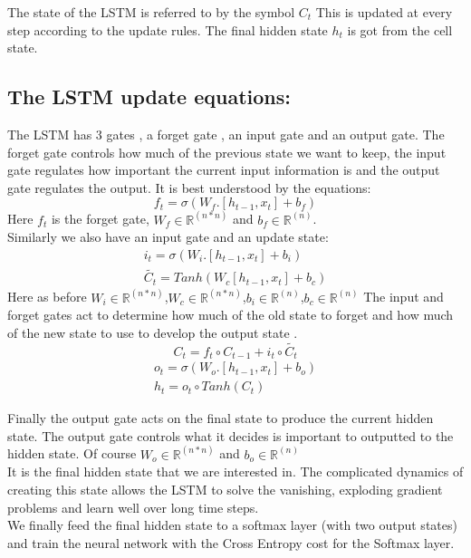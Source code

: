 \documentclass{article} %
\begin{document}
The state of the LSTM is referred to by the symbol $C_t$ This is updated at every step according to the update rules. The final hidden state
$h_t$ is got from the cell state.

\subsection{The LSTM update equations:}
The LSTM has 3 gates , a forget gate , an input gate and an output gate. The forget gate controls how much of the previous state we want to keep, the input gate regulates how important the current input information is and the output gate regulates the output. It is best understood by the equations:
\begin{equation}
f_t=\sigma(W_f.[h_{t-1},x_{t}]+b_f)
\end{equation}
Here $f_t$ is the forget gate, $W_f \in \mathbb{R}^{(n*n)}$  and $b_f \in \mathbb{R}^{(n)}$.\\
Similarly we also have an input gate and an update state:
\begin{eqnarray}
i_t=\sigma(W_i.[h_{t-1},x_{t}]+b_i)\\
\tilde{C_t}=Tanh(W_c[h_{t-1},x_{t}]+b_c)
\end{eqnarray}
Here as before $W_i \in \mathbb{R}^{(n*n)}$,$W_c \in \mathbb{R}^{(n*n)}$,$b_i \in \mathbb{R}^{(n)}$,$b_c \in \mathbb{R}^{(n)}$
The input and forget gates act to determine how much of the old state to forget and how much of the new state to use to develop the output state . \\

\begin{equation}
C_t=f_t \circ C_{t-1}+ i_t \circ \tilde{C_t}
\end{equation}
\begin{eqnarray}
o_t=\sigma(W_o.[h_{t-1},x_{t}]+b_o) \\
h_t=o_t \circ Tanh(C_t)
\end{eqnarray}

Finally the output gate acts on the final state to produce the current hidden state. The output gate controls what it decides is important to outputted to the hidden state. Of course $W_o \in \mathbb{R}^{(n*n)}$ and $b_o \in \mathbb{R}^{(n)}$ \\
It is the final hidden state that we are interested in. The complicated dynamics of creating this state allows the LSTM to solve the vanishing, exploding gradient problems and learn well over long time steps.\\
We finally feed the final hidden state to a softmax layer (with two output states) and train the neural network with the Cross Entropy cost for the Softmax layer. 
\end{document}
